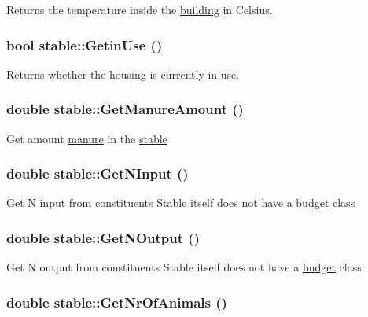 Returns the temperature inside the \hyperlink{classbuilding}{building} in Celsius. \hypertarget{classstable_a556b940db4c05999073d72bfee6adbbc}{
\subsubsection[{GetinUse}]{\setlength{\rightskip}{0pt plus 5cm}bool stable::GetinUse ()}}
\label{classstable_a556b940db4c05999073d72bfee6adbbc}


Returns whether the housing is currently in use. \hypertarget{classstable_a5c7b73de0ce9ab464cd2fbc326200286}{
\subsubsection[{GetManureAmount}]{\setlength{\rightskip}{0pt plus 5cm}double stable::GetManureAmount ()}}
\label{classstable_a5c7b73de0ce9ab464cd2fbc326200286}
Get amount \hyperlink{classmanure}{manure} in the \hyperlink{classstable}{stable} \hypertarget{classstable_a3361fcda27cc06bc63567e7afdd5270c}{
\subsubsection[{GetNInput}]{\setlength{\rightskip}{0pt plus 5cm}double stable::GetNInput ()}}
\label{classstable_a3361fcda27cc06bc63567e7afdd5270c}
Get N input from constituents Stable itself does not have a \hyperlink{classbudget}{budget} class \hypertarget{classstable_ae0081d6197b922c43e3c36780705e42f}{
\subsubsection[{GetNOutput}]{\setlength{\rightskip}{0pt plus 5cm}double stable::GetNOutput ()}}
\label{classstable_ae0081d6197b922c43e3c36780705e42f}
Get N output from constituents Stable itself does not have a \hyperlink{classbudget}{budget} class \hypertarget{classstable_a09fd313c5cc182435bf0c39f6127a68c}{
\subsubsection[{GetNrOfAnimals}]{\setlength{\rightskip}{0pt plus 5cm}double stable::GetNrOfAnimals ()}}
\label{classstable_a09fd313c5cc182435bf0c39f6127a68c}


